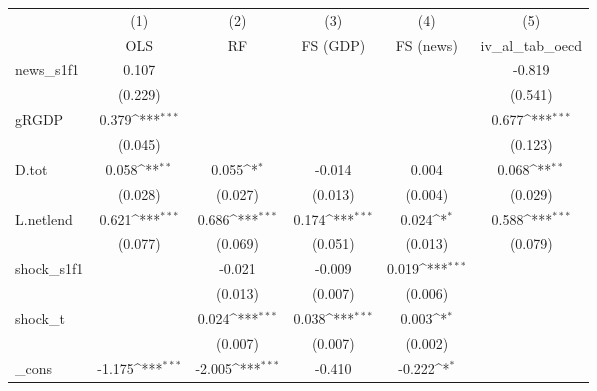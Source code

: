 {
\def\sym#1{\ifmmode^{#1}\else\(^{#1}\)\fi}
\begin{tabular}{l*{5}{c}}
\toprule
            &\multicolumn{1}{c}{(1)}&\multicolumn{1}{c}{(2)}&\multicolumn{1}{c}{(3)}&\multicolumn{1}{c}{(4)}&\multicolumn{1}{c}{(5)}\\
            &\multicolumn{1}{c}{OLS}&\multicolumn{1}{c}{RF}&\multicolumn{1}{c}{FS (GDP)}&\multicolumn{1}{c}{FS (news)}&\multicolumn{1}{c}{iv\_al\_tab\_oecd}\\
\midrule
news\_s1f1   &       0.107         &                     &                     &                     &      -0.819         \\
            &     (0.229)         &                     &                     &                     &     (0.541)         \\
\addlinespace
gRGDP       &       0.379\sym{***}&                     &                     &                     &       0.677\sym{***}\\
            &     (0.045)         &                     &                     &                     &     (0.123)         \\
\addlinespace
D.tot       &       0.058\sym{**} &       0.055\sym{*}  &      -0.014         &       0.004         &       0.068\sym{**} \\
            &     (0.028)         &     (0.027)         &     (0.013)         &     (0.004)         &     (0.029)         \\
\addlinespace
L.netlend   &       0.621\sym{***}&       0.686\sym{***}&       0.174\sym{***}&       0.024\sym{*}  &       0.588\sym{***}\\
            &     (0.077)         &     (0.069)         &     (0.051)         &     (0.013)         &     (0.079)         \\
\addlinespace
shock\_s1f1  &                     &      -0.021         &      -0.009         &       0.019\sym{***}&                     \\
            &                     &     (0.013)         &     (0.007)         &     (0.006)         &                     \\
\addlinespace
shock\_t     &                     &       0.024\sym{***}&       0.038\sym{***}&       0.003\sym{*}  &                     \\
            &                     &     (0.007)         &     (0.007)         &     (0.002)         &                     \\
\addlinespace
\_cons      &      -1.175\sym{***}&      -2.005\sym{***}&      -0.410         &      -0.222\sym{*}  &                     \\

\end{tabular}}

